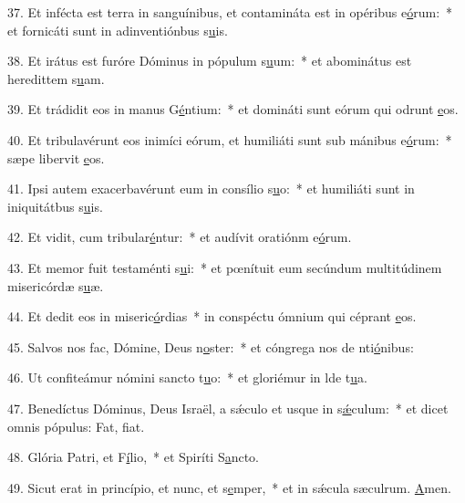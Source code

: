 37. Et infécta est terra in sanguínibus, et contamináta est in opéribus e\uline{ó}rum:~* et fornicáti sunt in adinventiónbus s\uline{u}is.\par 
38. Et irátus est furóre Dóminus in pópulum s\uline{u}um:~* et abominátus est heredittem s\uline{u}am.\par 
39. Et trádidit eos in manus G\uline{é}ntium:~* et domináti sunt eórum qui odrunt \uline{e}os.\par 
40. Et tribulavérunt eos inimíci eórum, et humiliáti sunt sub mánibus e\uline{ó}rum:~* sæpe libervit \uline{e}os.\par 
41. Ipsi autem exacerbavérunt eum in consílio s\uline{u}o:~* et humiliáti sunt in iniquitátbus s\uline{u}is.\par 
42. Et vidit, cum tribular\uline{é}ntur:~* et audívit oratiónm e\uline{ó}rum.\par 
43. Et memor fuit testaménti s\uline{u}i:~* et pœnítuit eum secúndum multitúdinem misericórdæ s\uline{u}æ.\par 
44. Et dedit eos in miseric\uline{ó}rdias~* in conspéctu ómnium qui céprant \uline{e}os.\par 
45. Salvos nos fac, Dómine, Deus n\uline{o}ster:~* et cóngrega nos de nti\uline{ó}nibus:\par 
46. Ut confiteámur nómini sancto t\uline{u}o:~* et gloriémur in lde t\uline{u}a.\par 
47. Benedíctus Dóminus, Deus Israël, a sǽculo et usque in s\uline{ǽ}culum:~* et dicet omnis pópulus: Fat, f\uline{i}at.\par 
48. Glória Patri, et F\uline{í}lio,~* et Spiríti S\uline{a}ncto.\par 
49. Sicut erat in princípio, et nunc, et s\uline{e}mper,~* et in sǽcula sæculrum. \uline{A}men.\par 
